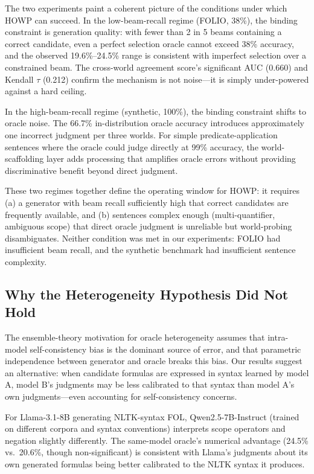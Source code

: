 \documentclass[11pt,letterpaper]{article}
\begin{document}
The two experiments paint a coherent picture of the conditions under which HOWP can succeed. In the low-beam-recall regime (FOLIO, 38\%), the binding constraint is generation quality: with fewer than 2 in 5 beams containing a correct candidate, even a perfect selection oracle cannot exceed 38\% accuracy, and the observed 19.6\%--24.5\% range is consistent with imperfect selection over a constrained beam. The cross-world agreement score's significant AUC (0.660) and Kendall $\tau$ (0.212) confirm the mechanism is not noise---it is simply under-powered against a hard ceiling.

In the high-beam-recall regime (synthetic, 100\%), the binding constraint shifts to oracle noise. The 66.7\% in-distribution oracle accuracy introduces approximately one incorrect judgment per three worlds. For simple predicate-application sentences where the oracle could judge directly at 99\% accuracy, the world-scaffolding layer adds processing that amplifies oracle errors without providing discriminative benefit beyond direct judgment.

These two regimes together define the operating window for HOWP: it requires (a) a generator with beam recall sufficiently high that correct candidates are frequently available, and (b) sentences complex enough (multi-quantifier, ambiguous scope) that direct oracle judgment is unreliable but world-probing disambiguates. Neither condition was met in our experiments: FOLIO had insufficient beam recall, and the synthetic benchmark had insufficient sentence complexity.

\subsection{Why the Heterogeneity Hypothesis Did Not Hold}

The ensemble-theory motivation for oracle heterogeneity assumes that intra-model self-consistency bias is the dominant source of error, and that parametric independence between generator and oracle breaks this bias. Our results suggest an alternative: when candidate formulas are expressed in syntax learned by model A, model B's judgments may be less calibrated to that syntax than model A's own judgments---even accounting for self-consistency concerns.

For Llama-3.1-8B generating NLTK-syntax FOL, Qwen2.5-7B-Instruct (trained on different corpora and syntax conventions) interprets scope operators and negation slightly differently. The same-model oracle's numerical advantage (24.5\% vs.\ 20.6\%, though non-significant) is consistent with Llama's judgments about its own generated formulas being better calibrated to the NLTK syntax it produces.
\end{document}

